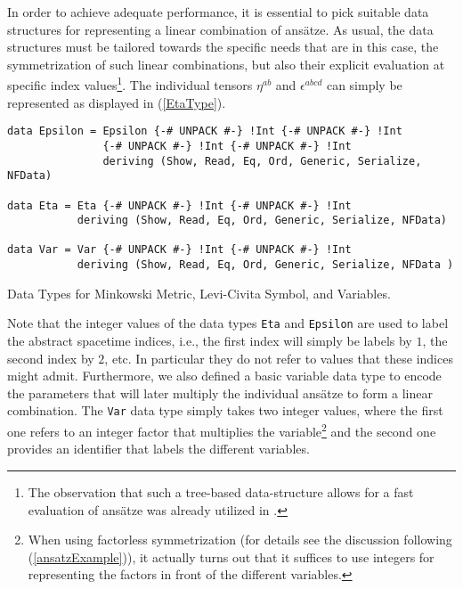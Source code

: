 In order to achieve adequate performance, it is essential to pick suitable data structures for representing a linear combination of ansätze. As usual, the data structures must be tailored towards the specific needs that are in this case, the symmetrization of such linear combinations, but also their explicit evaluation at specific index values\footnote{The observation that such a tree-based data-structure allows for a fast evaluation of ansätze was already utilized in \cite{tensor-trees}.}.  
The individual tensors $\eta^{ab}$ and $\epsilon^{abcd}$ can simply be represented as displayed in (\ref{EtaType}).
\begin{listing}[hbt!] 
\begin{verbatim}
data Epsilon = Epsilon {-# UNPACK #-} !Int {-# UNPACK #-} !Int
               {-# UNPACK #-} !Int {-# UNPACK #-} !Int
               deriving (Show, Read, Eq, Ord, Generic, Serialize, NFData)

data Eta = Eta {-# UNPACK #-} !Int {-# UNPACK #-} !Int 
           deriving (Show, Read, Eq, Ord, Generic, Serialize, NFData)

data Var = Var {-# UNPACK #-} !Int {-# UNPACK #-} !Int 
           deriving (Show, Read, Eq, Ord, Generic, Serialize, NFData )
\end{verbatim} 
\caption{Data Types for Minkowski Metric, Levi-Civita Symbol, and Variables.}\label{EtaType}
\end{listing}
Note that the integer values of the data types \texttt{Eta} and \texttt{Epsilon} are used to label the abstract spacetime indices, i.e., the first index will simply be labels by $1$, the second index by $2$, etc. In particular they do not refer to values that these indices might admit.
Furthermore, we also defined a basic variable data type to encode the parameters that will later multiply the individual ansätze to form a linear combination. The \texttt{Var}
data type simply takes two integer values, where the first one refers to an integer factor that multiplies the variable\footnote{When using factorless symmetrization (for details see the discussion following (\ref{ansatzExample})), it actually turns out that it suffices to use integers for representing the factors in front of the different variables.} and the second one provides an identifier that labels the different variables. 

